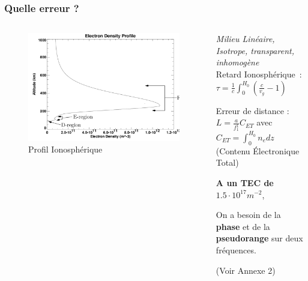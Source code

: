 \documentclass[xcolor=dvipsnames,envcountsect]{beamer}
\begin{document}
\begin{frame}
	\frametitle{Quelle erreur ?}
	\justifying
		\begin{columns}
			\begin{column}{0.5\textwidth}
				\begin{figure}
					\centering
					\includegraphics[width=1\textwidth]{./Figures/iono_profil.png}
					\caption {Profil Ionosphérique \cite{ionoprofil}}
				\end{figure}
			\end{column}
			\begin{column}{0.5\textwidth}
				{\tiny \textit{Milieu Linéaire, Isotrope, transparent, inhomogène}}\\
				Retard Ionosphérique : \\
				$\tau = \frac{1}{c} \int_{0}^{H_0} (\frac{c}{v_g}-1)$ \newline

				Erreur de distance : \\
				$L = \frac{a}{f_1^1} C_{ET}$ avec $C_{ET} = \int_{0}^{H_0} n_e dz$ (Contenu Électronique Total)
				\newline

				\begin{center}
					\textbf{A un TEC de }$1.5\cdot 10^{17} m^{-2}$, 
				\end{center}

				On a besoin de la \textbf{phase} et de la \textbf{pseudorange} sur deux fréquences.
				\begin{flushright}
					\tiny{(Voir Annexe 2)}
				\end{flushright}
			\end{column}
		\end{columns}
\end{frame}
\end{document}

